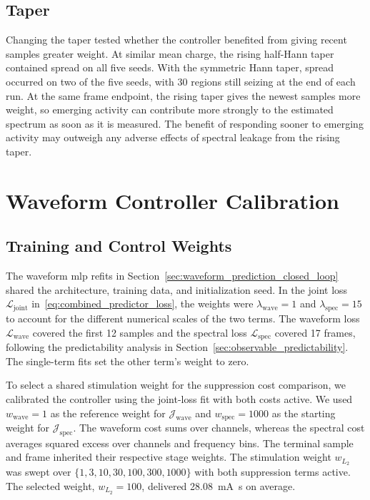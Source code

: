 \subsection{Taper}

Changing the taper tested whether the controller benefited from giving recent samples greater weight.
At similar mean charge, the rising half-Hann taper contained spread on all five seeds.
With the symmetric Hann taper, spread occurred on two of the five seeds, with 30 regions still seizing at the end of each run.
At the same frame endpoint, the rising taper gives the newest samples more weight, so emerging activity can contribute more strongly to the estimated spectrum as soon as it is measured.
The benefit of responding sooner to emerging activity may outweigh any adverse effects of spectral leakage from the rising taper.

\FloatBarrier
\section{Waveform Controller Calibration}\label{sec:waveform_controller_calibration}

\subsection{Training and Control Weights}\label{sec:waveform_cost_calibration}

The waveform \ac{mlp} refits in Section~\ref{sec:waveform_prediction_closed_loop} shared the architecture, training data, and initialization seed.
In the joint loss \(\mathcal{L}_\mathrm{joint}\) in~\eqref{eq:combined_predictor_loss}, the weights were \(\lambda_\mathrm{wave}=1\) and \(\lambda_\mathrm{spec}=15\) to account for the different numerical scales of the two terms.
The waveform loss \(\mathcal{L}_\mathrm{wave}\) covered the first 12 samples and the spectral loss \(\mathcal{L}_\mathrm{spec}\) covered 17 frames, following the predictability analysis in Section~\ref{sec:observable_predictability}.
The single-term fits set the other term's weight to zero.

To select a shared stimulation weight for the suppression cost comparison, we calibrated the controller using the joint-loss fit with both costs active.
We used \(w_{\mathrm{wave}}=1\) as the reference weight for \(\mathcal J_{\mathrm{wave}}\) and \(w_{\mathrm{spec}}=1000\) as the starting weight for \(\mathcal J_{\mathrm{spec}}\).
The waveform cost sums over channels, whereas the spectral cost averages squared excess over channels and frequency bins.
The terminal sample and frame inherited their respective stage weights.
The stimulation weight \(w_{L_2}\) was swept over \(\{1, 3, 10, 30, 100, 300, 1000\}\) with both suppression terms active.
The selected weight, \(w_{L_2}=100\), delivered \SI{28.08}{\milli\ampere\second} on average.

